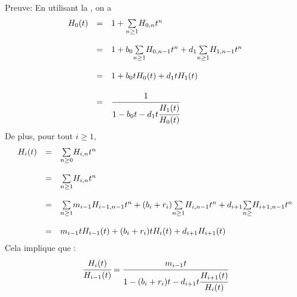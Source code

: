 Preuve:
En utilisant la , on a
$$
	\begin{array}{r c l}
		H_{0}(t) & =       & 1+\underset{n\geq1}{\sum}H_{0,n}t^n                                                 \\
		         & \text{}                                                                                       \\
		         & =       & 1+b_{0}\underset{n\geq1}{\sum}H_{0,n-1}t^n+d_{1}\underset{n\geq1}{\sum}H_{1,n-1}t^n \\
		         & \text{}                                                                                       \\
		         & =       & 1+b_{0}tH_{0}(t)+d_{1}tH_{1}(t)                                                     \\
		         & \text{}                                                                                       \\
		         & =       & \cfrac{1}{1-b_{0}t-d_{1}t\cfrac{H_{1}(t)}{H_{0}(t)}}
	\end{array}
$$
De plus, pour tout $i\geq1$,
\[
	\begin{array}{r c l}
		H_{i}(t) & =       & \underset{n\geq0}{\sum}H_{i,n}t^n                                                                     \\
		         & \text{} &                                                                                                       \\
		         & =       & \underset{n\geq1}{\sum}H_{i,n}t^n                                                                     \\
		         & \text{} &                                                                                                       \\
		         & =       & \underset{n\geq1}{\sum}m_{i-1}H_{i-1,n-1}t^n+(b_{i}+r_{i})\underset{n\geq1}{\sum}H_{i,n-1}t^n+d_{i+1}
		\underset{n\geq}{\sum}H_{i+1,n-1}t^n                                                                                       \\
		         & \text{} &                                                                                                       \\
		         & =       & m_{i-1}tH_{i-1}(t)+(b_{i}+r_{i})tH_{i}(t)+d_{i+1}H_{i+1}(t)
	\end{array}
\]
Cela implique que :\\
\[
	\cfrac{H_{i}(t)}{H_{i-1}(t)}=\cfrac{m_{i-1}t}{1-(b_{i}+r_{i})t-d_{i+1}t\cfrac{H_{i+1}(t)}{H_{i}(t)}}
\]
